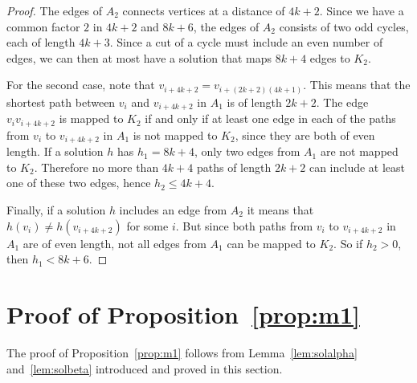 \documentclass[11pt,a4paper]{article}
\begin{document}
\begin{proof}
The edges of $A_2$ connects vertices at a distance of $4k+2$.
Since we have a common factor $2$ in $4k+2$ and $8k+6$,
the edges of $A_2$ consists of two odd cycles, each of length $4k+3$.
Since a cut of a cycle must include an even number of edges, 
we can then at most have a solution that maps $8k+4$ edges to $K_2$.

For the second case, 
note that $v_{i+4k+2}=v_{i+(2k+2)(4k+1)}$. 
This means that the shortest path between $v_i$ and $v_{i+4k+2}$ in $A_1$
is of length $2k+2$. The edge $v_i v_{i+4k+2}$ is mapped to $K_2$ 
if and only if at least one edge in each of the paths from $v_i$ to $v_{i+4k+2}$ in
 $A_1$ is not mapped to $K_2$, since they are both of even length.
If a solution $h$ has $h_1=8k+4$, only two edges from $A_1$ are
 not mapped to $K_2$.
Therefore no more than $4k+4$ paths of length $2k+2$ can include 
at least one of these two edges, hence $h_2 \leq 4k+4$.

Finally, if a solution $h$ includes an edge from $A_2$ it means that 
$h(v_i) \neq h(v_{i+4k+2})$ for some $i$.
But since both paths from $v_i$ to $v_{i+4k+2}$ in $A_1$ are of even length,
not all edges from $A_1$ can be mapped to $K_2$. 
So if $h_2 > 0$, then $h_1 < 8k+6$.

\end{proof}

\section{Proof of Proposition~\ref{prop:m1}} \label{app:propm1proof}

The proof of Proposition~\ref{prop:m1} follows from Lemma~\ref{lem:solalpha} and~\ref{lem:solbeta} introduced and proved in this section.
\end{document}
